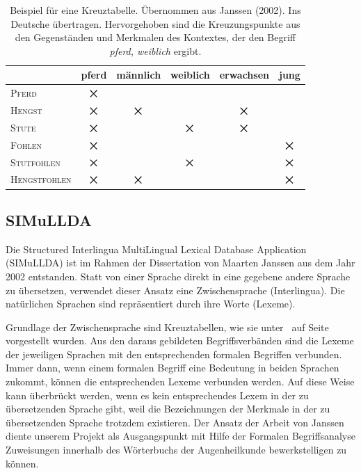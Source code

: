 \documentclass[pagesize,paper=A4,DIV=calc,fontsize=12pt,draft=false]{scrreprt}
\newcommand*{\bigtimes}{\mathop{\raisebox{-.15ex}{\hbox{\Large{$\times$}}}}}
\begin{document}
\begin{table}[h!]
\centering
\renewcommand{\arraystretch}{2}
\begin{tabularx}{.7\linewidth}{@{}l|c|c|c|c|c@{}}
&
\cellcolor{mgray}pferd &
männlich &
\cellcolor{mgray}weiblich &
erwachsen &
jung\\
\hline
\textsc{Pferd}	&	
\cellcolor{mgray}$\bigtimes$	&&
\cellcolor{mgray}&&\\
\hline
\textsc{Hengst}	&	
\cellcolor{mgray}$\bigtimes$	&	
$\bigtimes$	&	
\cellcolor{mgray}	&	
$\bigtimes$	&\\
\hline
\rowcolor{mgray}
\textsc{Stute}	&	
\cellcolor{intersect}\color{white}$\bigtimes$	&&	
\cellcolor{intersect}\color{white}$\bigtimes$	&	
$\bigtimes$	&\\
\hline
\textsc{Fohlen}	&	
\cellcolor{mgray}$\bigtimes$	&&	
\cellcolor{mgray}	&&	
$\bigtimes$\\
\hline
\rowcolor{mgray}\color{black}
\textsc{Stutfohlen}	&	
\cellcolor{intersect}\color{white}$\bigtimes$	&&	
\cellcolor{intersect}\color{white}$\bigtimes$	&&	
$\bigtimes$\\
\hline
\textsc{Hengstfohlen}	&	
\cellcolor{mgray}$\bigtimes$	&	
$\bigtimes$	&
\cellcolor{mgray}	&&	
$\bigtimes$
\end{tabularx}
\caption{Beispiel für eine Kreuztabelle. Übernommen aus Janssen (2002). Ins Deutsche übertragen. Hervorgehoben sind die Kreuzungspunkte aus den Gegenständen und Merkmalen des Kontextes, der den Begriff \textit{pferd, weiblich} ergibt.}
\label{tab:janssen}
\end{table}

\subsection{SIMuLLDA}

Die Structured Interlingua MultiLingual Lexical Database Application (SIMuLLDA) ist im Rahmen der Dissertation von Maarten Janssen aus dem Jahr 2002 entstanden. 
Statt von einer Sprache direkt in eine gegebene andere Sprache zu übersetzen, verwendet dieser Ansatz eine Zwischensprache (Interlingua). 
Die natürlichen Sprachen sind repräsentiert durch ihre Worte (Lexeme). 

Grundlage der Zwischensprache sind Kreuztabellen, wie sie unter\emph{~} auf Seite~\pageref{subsec:fba} vorgestellt wurden. 
Aus den daraus gebildeten Begriffsverbänden sind die Lexeme der jeweiligen Sprachen mit den entsprechenden formalen Begriffen verbunden. 
Immer dann, wenn einem formalen Begriff eine Bedeutung in beiden Sprachen zukommt, können die entsprechenden Lexeme verbunden werden. 
Auf diese Weise kann überbrückt werden, wenn es kein entsprechendes Lexem in der zu übersetzenden Sprache gibt, weil die Bezeichnungen der Merkmale in der zu übersetzenden Sprache trotzdem existieren. 
Der Ansatz der Arbeit von Janssen diente unserem Projekt als Ausgangspunkt mit Hilfe der Formalen Begriffsanalyse Zuweisungen innerhalb des Wörterbuchs der Augenheilkunde bewerkstelligen zu können. 
\end{document}
